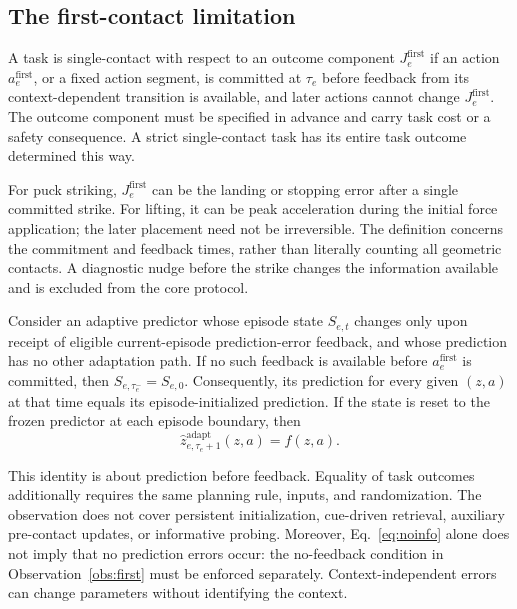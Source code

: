 \subsection{The first-contact limitation}
\begin{definition}
A task is single-contact with respect to an outcome component $J_e^{\mathrm{first}}$ if an action $a_e^{\mathrm{first}}$, or a fixed action segment, is committed at $\tau_e$ before feedback from its context-dependent transition is available, and later actions cannot change $J_e^{\mathrm{first}}$. The outcome component must be specified in advance and carry task cost or a safety consequence. A strict single-contact task has its entire task outcome determined this way.
\end{definition}
For puck striking, $J_e^{\mathrm{first}}$ can be the landing or stopping error after a single committed strike. For lifting, it can be peak acceleration during the initial force application; the later placement need not be irreversible. The definition concerns the commitment and feedback times, rather than literally counting all geometric contacts. A diagnostic nudge before the strike changes the information available and is excluded from the core protocol.

\begin{observation}\label{obs:first}
Consider an adaptive predictor whose episode state $S_{e,t}$ changes only upon receipt of eligible current-episode prediction-error feedback, and whose prediction has no other adaptation path. If no such feedback is available before $a_e^{\mathrm{first}}$ is committed, then $S_{e,\tau_e^-}=S_{e,0}$. Consequently, its prediction for every given $(z,a)$ at that time equals its episode-initialized prediction. If the state is reset to the frozen predictor at each episode boundary, then
\begin{equation}\label{eq:firstidentity}
\hat z^{\mathrm{adapt}}_{e,\tau_e+1}(z,a)=f(z,a).
\end{equation}
\end{observation}
This identity is about prediction before feedback. Equality of task outcomes additionally requires the same planning rule, inputs, and randomization. The observation does not cover persistent initialization, cue-driven retrieval, auxiliary pre-contact updates, or informative probing. Moreover, Eq.~\eqref{eq:noinfo} alone does not imply that no prediction errors occur: the no-feedback condition in Observation~\ref{obs:first} must be enforced separately. Context-independent errors can change parameters without identifying the context.

